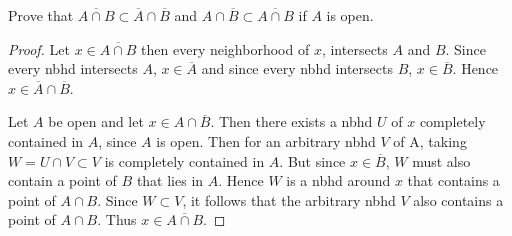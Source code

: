     \question 
    Prove that $\overline{A \cap B} \subset \overline{A} \cap \overline{B}$ and $A \cap \overline{B} \subset \overline{A \cap B}$ if $A$ is open. 
    \begin{proof}
        Let $x \in \overline{A \cap B}$ then every neighborhood of $x$, intersects $A$ and $B$. Since every nbhd intersects $A$, 
        $x \in \overline{A}$ and since every nbhd intersects $B$, $x \in \overline{B}$. Hence $x \in \overline{A} \cap \overline{B}$. 

        Let $A$ be open and let $x \in A \cap \overline{B}$. Then there exists a nbhd $U$ of $x$ completely contained in $A$, since $A$ is open. 
        Then for an arbitrary nbhd $V$ of A, taking $W = U \cap V \subset V$ is completely contained in $A$. But since $x \in \overline{B}$, 
        $W$ must also contain a point of $B$ that lies in $A$. Hence $W$ is a nbhd around $x$ that contains a point of $A \cap B$. 
        Since $W \subset V$, it follows that the arbitrary nbhd $V$ also contains a point of $A \cap B$. Thus $x \in \overline{A \cap B}$. 

    \end{proof}
